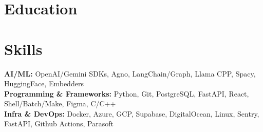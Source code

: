 \documentclass{../templates/simplecv}
\begin{document}
\section{Education}
\resumeItemListStart
{}
\resumeItemListEnd

\vspace{2pt}

\section{Skills}
\vspace{2pt}
\resumeSubHeadingListStart
\small{\item{
\textbf{AI/ML: }{OpenAI/Gemini SDKs, Agno, LangChain/Graph, Llama CPP, Spacy, HuggingFace, Embedders} \\ \vspace{1pt}
\textbf{Programming \& Frameworks: }{Python, Git, PostgreSQL, FastAPI, React, Shell/Batch/Make, Figma, C/C++} \\ \vspace{1pt}
\textbf{Infra \& DevOps: }{Docker, Azure, GCP, Supabase, DigitalOcean, Linux, Sentry, FastAPI, Github Actions, Parasoft} \\ \vspace{1pt}
}}
\resumeSubHeadingListEnd
\end{document}
